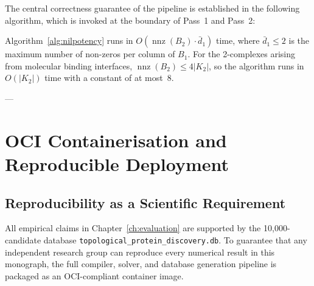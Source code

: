 The central correctness guarantee of the pipeline is established in the
following algorithm, which is invoked at the boundary of Pass~1 and Pass~2:

\begin{algorithm}[H]
\caption{Static Nilpotency Verifier ($B_1 B_2 \stackrel{?}{=} 0$).}
\label{alg:nilpotency}
\BlankLine
{}
\end{algorithm}

\begin{proposition}
\label{prop:nilpotency_complexity}
Algorithm~\ref{alg:nilpotency} runs in
$O(\operatorname{nnz}(B_2) \cdot \bar{d}_1)$ time, where
$\bar{d}_1 \le 2$ is the maximum number of non-zeros per column of $B_1$.
For the 2-complexes arising from molecular binding interfaces,
$\operatorname{nnz}(B_2) \le 4|K_2|$, so the algorithm runs in
$O(|K_2|)$ time with a constant of at most~8.
\end{proposition}

---

\section{OCI Containerisation and Reproducible Deployment}
\label{sec:container}

\subsection{Reproducibility as a Scientific Requirement}
\label{subsec:repro_rationale}

All empirical claims in Chapter~\ref{ch:evaluation} are supported by
the 10,000-candidate database
\texttt{topological\_\allowbreak protein\_\allowbreak discovery.db}.
To guarantee that any independent research group can reproduce every
numerical result in this monograph, the full compiler, solver, and
database generation pipeline is packaged as an OCI-compliant container
image.

